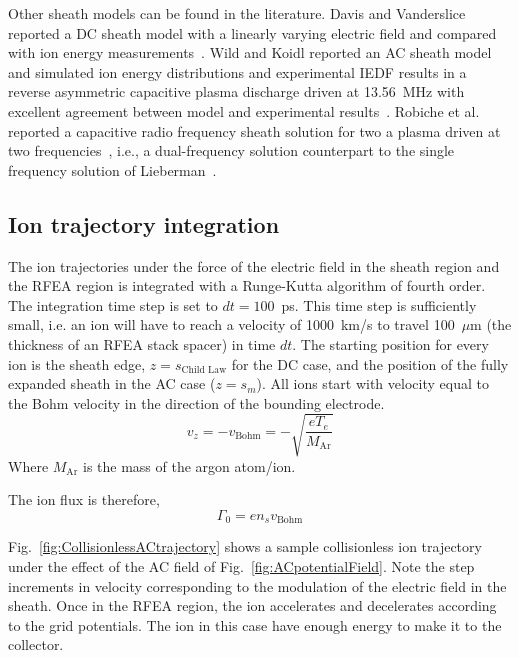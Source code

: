 Other sheath models can be found in the literature. Davis and Vanderslice reported a DC sheath model with a linearly varying electric field and compared with ion energy measurements~\cite{Davis1963}. Wild and Koidl reported an AC sheath model and simulated ion energy distributions and experimental IEDF results in a reverse asymmetric capacitive plasma discharge driven at 13.56~MHz with excellent agreement between model and experimental results~\cite{Wild1991}. Robiche et al. reported a capacitive radio frequency sheath solution for two a plasma driven at two frequencies~\cite{Robiche2003}, i.e., a dual-frequency solution counterpart to the single frequency solution of Lieberman~\cite{Lieberman1988}.   







\subsection{\label{IonTrajectory}Ion trajectory integration}
The ion trajectories under the force of the electric field in the sheath region and the RFEA region is integrated with a Runge-Kutta algorithm of fourth order. The integration time step is set to $dt=100$~ps. This time step is sufficiently small, i.e. an ion will have to reach a velocity of 1000~km/s to travel 100~$\mu$m (the thickness of an RFEA stack spacer) in time $dt$. The starting position for every ion is the sheath edge, $z=s_\text{Child Law}$ for the DC case, and the position of the fully expanded sheath in the AC case ($z=s_m$). All ions start with velocity equal to the Bohm velocity in the direction of the bounding electrode.
\begin{equation}
v_z = - v_\text{Bohm} = -\sqrt{\frac{e T_e}{M_\text{Ar}}}
\end{equation}
Where $M_\text{Ar}$ is the mass of the argon atom/ion. 

The ion flux is therefore, 
\begin{equation}
\Gamma_0 = e n_s v_\text{Bohm} 
\end{equation}

Fig.~\ref{fig:CollisionlessACtrajectory} shows a sample collisionless ion trajectory under the effect of the AC field of Fig.~\ref{fig:ACpotentialField}. Note the step increments in velocity corresponding to the modulation of the electric field in the sheath. Once in the RFEA region, the ion accelerates and decelerates according to the grid potentials. The ion in this case have enough energy to make it to the collector. 

